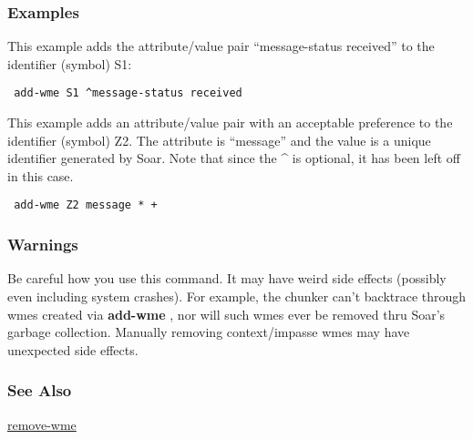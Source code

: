 \subsubsection*{Examples}
 This example adds the attribute/value pair ``message-status received'' to the identifier (symbol) S1: \begin{verbatim}
 add-wme S1 ^message-status received
\end{verbatim}
 This example adds an attribute/value pair with an acceptable preference to the identifier (symbol) Z2. The attribute is ``message'' and the value is a unique identifier generated by Soar. Note that since the \^{} is optional, it has been left off in this case. \begin{verbatim}
 add-wme Z2 message * + 
\end{verbatim}
\subsubsection*{Warnings}
 Be careful how you use this command. It may have weird side effects (possibly even including system crashes). For example, the chunker can't backtrace through wmes created via \textbf{add-wme}
, nor will such wmes ever be removed thru Soar's garbage collection. Manually removing context/impasse wmes may have unexpected side effects. 
\subsubsection*{See Also}
\hyperref[remove-wme]{remove-wme} 